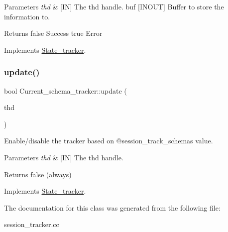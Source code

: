 \begin{DoxyParams}{Parameters}
{\em thd} & \mbox{[}IN\mbox{]} The thd handle.  buf \mbox{[}I\+N\+O\+UT\mbox{]} Buffer to store the information to.\\
\hline
\end{DoxyParams}
\begin{DoxyReturn}{Returns}
false Success true Error 
\end{DoxyReturn}


Implements \mbox{\hyperlink{classState__tracker_aee5cd5c5ed19fbd4c8ac01dbd62471e7}{State\+\_\+tracker}}.

\mbox{\label{classCurrent__schema__tracker_a087a504d0c2ff939acecf08c891d3725}} 
\subsubsection{\texorpdfstring{update()}{update()}}
{\footnotesize\ttfamily bool Current\+\_\+schema\+\_\+tracker\+::update (\begin{DoxyParamCaption}\item[{T\+HD $\ast$}]{thd }\end{DoxyParamCaption})\hspace{0.3cm}{\ttfamily [virtual]}}



Enable/disable the tracker based on @session\+\_\+track\+\_\+schema\textquotesingle{}s value. 


\begin{DoxyParams}{Parameters}
{\em thd} & \mbox{[}IN\mbox{]} The thd handle.\\
\hline
\end{DoxyParams}
\begin{DoxyReturn}{Returns}
false (always) 
\end{DoxyReturn}


Implements \mbox{\hyperlink{classState__tracker_a74ffdcb79733e8d31e9fe2dcae346022}{State\+\_\+tracker}}.



The documentation for this class was generated from the following file\+:\begin{DoxyCompactItemize}
\item 
session\+\_\+tracker.\+cc\end{DoxyCompactItemize}
